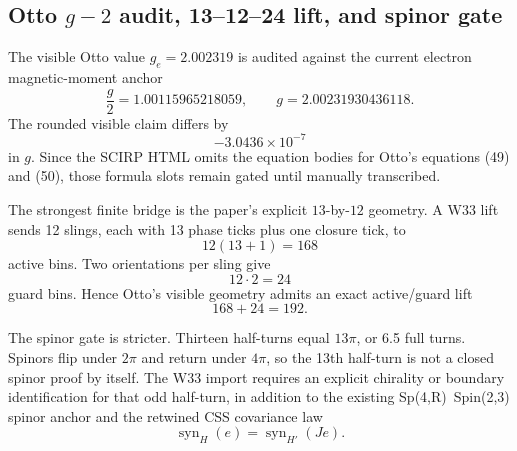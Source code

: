 \subsection{Otto \texorpdfstring{$g-2$}{g-2} audit, 13--12--24 lift, and spinor gate}
\label{sec:bt1438-bt1440-otto-gminus2-mobius-spinor}

The visible Otto value \(g_e=2.002319\) is audited against the current electron
magnetic-moment anchor
\[
\frac{g}{2}=1.00115965218059,
\qquad
 g=2.00231930436118.
\]
The rounded visible claim differs by
\[
-3.0436\times10^{-7}
\]
in \(g\).  Since the SCIRP HTML omits the equation bodies for Otto's equations
(49) and (50), those formula slots remain gated until manually transcribed.

The strongest finite bridge is the paper's explicit \(13\)-by-\(12\) geometry.
A W33 lift sends 12 slings, each with 13 phase ticks plus one closure tick, to
\[
12(13+1)=168
\]
active bins.  Two orientations per sling give
\[
12\cdot2=24
\]
guard bins.  Hence Otto's visible geometry admits an exact active/guard lift
\[
168+24=192.
\]

The spinor gate is stricter.  Thirteen half-turns equal \(13\pi\), or 6.5 full
turns.  Spinors flip under \(2\pi\) and return under \(4\pi\), so the 13th
half-turn is not a closed spinor proof by itself.  The W33 import requires an
explicit chirality or boundary identification for that odd half-turn, in
addition to the existing Sp(4,R)~Spin(2,3) spinor anchor and the retwined CSS
covariance law
\[
\operatorname{syn}_{H}(e)=\operatorname{syn}_{H'}(Je).
\]
